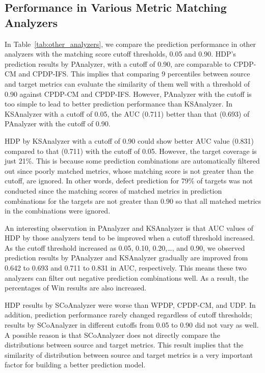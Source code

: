 \subsection{Performance in Various Metric Matching Analyzers}
\label{subsec05}

In Table~\ref{tab:other_analyzers}, we compare the prediction performance in
other analyzers with the matching score cutoff thresholds, 0.05 and 0.90.
HDP's prediction results by PAnalyzer, with a cutoff of 0.90, are
comparable to CPDP-CM and CPDP-IFS. This
implies that comparing 9 percentiles between source and target metrics can
evaluate the similarity of them well with a threshold of 0.90 against CPDP-CM and CPDP-IFS. However,
PAnalyzer with the cutoff is
too simple to lead to better prediction performance than KSAnalyzer. In
KSAnalyzer with a cutoff of 0.05, the AUC (0.711) better than that (0.693) of PAnalyzer with the cutoff of 0.90.

HDP by KSAnalyzer with a cutoff of 0.90 could show better AUC value (0.831) compared to that (0.711) with the
cutoff of 0.05.
However, the target coverage is just 21\%. This is because some prediction
combinations are automatically filtered out since poorly matched metrics, whose
matching score is not greater than the cutoff, are ignored. In other words,
defect prediction for 79\% of targets was not
conducted since the matching scores of matched metrics in prediction
combinations for the targets are not greater than 0.90 so
that all matched metrics in the combinations were ignored.

An interesting observation in PAnalyzer and KSAnalyzer is that AUC
values of HDP by those analyzers tend to be improved when a cutoff threshold
increased. As the cutoff threshold increased as 0.05, 0.10, 0.20,\ldots, and
0.90, we observed prediction results by PAnalyzer and KSAnalyzer
gradually are improved from 0.642 to 0.693 and 0.711 to 0.831 in AUC, respectively.
This means these two analyzers can filter out negative prediction combinations
well. As a result, the percentages of Win results are also increased.

HDP results by SCoAnalyzer were
worse than WPDP, CPDP-CM, and UDP. In addition,
prediction performance rarely changed regardless of cutoff thresholds; results
by SCoAnalyzer in different cutoffs from 0.05 to 0.90 did not
vary as well.
A possible reason is that SCoAnalyzer does not directly compare
the distributions between source and target metrics.
This result implies that the similarity of distribution between source and
target metrics is a very important factor for building a better
prediction model.


